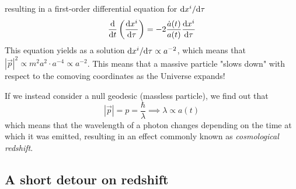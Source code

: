 resulting in a first-order differential equation for $\text{d}x^{i}/\text{d}\tau$
\begin{equation}
    \frac{\text{d}}{\text{d}t}\left(\frac{\text{d}x^{i}}{\text{d}\tau}\right) = -2\frac{\dot{a}(t)}{a(t)}\frac{\text{d}x^{i}}{\text{d}\tau}
\end{equation}
This equation yields as a solution $\text{d}x^{i}/\text{d}\tau \propto a^{-2}$, which means that $|\vec{p}|^{2} \propto m^{2}a^{2}\cdot a^{-4} \propto a^{-2}$. This means that a massive particle "slows down" with respect to the comoving coordinates as the Universe expands!
\par If we instead consider a null geodesic (massless particle), we find out that
\begin{equation}
    |\vec{p}| = p = \frac{\hbar}{\lambda} \implies \lambda \propto a(t)
\end{equation}
which means that the wavelength of a photon changes depending on the time at which it was emitted, resulting in an effect commonly known as \emph{cosmological redshift}.

\subsection{A short detour on redshift}

